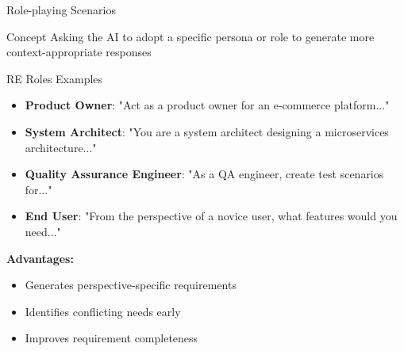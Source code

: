 \documentclass{beamer}
\begin{document}
\begin{frame}[t]{Role-playing Scenarios}
    \begin{block}{Concept}
        Asking the AI to adopt a specific persona or role to generate more context-appropriate responses
    \end{block}
    
    \begin{exampleblock}{RE Roles Examples}
        \begin{itemize}
            \item \textbf{Product Owner}: "Act as a product owner for an e-commerce platform..."
            \item \textbf{System Architect}: "You are a system architect designing a microservices architecture..."
            \item \textbf{Quality Assurance Engineer}: "As a QA engineer, create test scenarios for..."
            \item \textbf{End User}: "From the perspective of a novice user, what features would you need..."
        \end{itemize}
    \end{exampleblock}
    
    \textbf{Advantages:}
    \begin{itemize}
        \item Generates perspective-specific requirements
        \item Identifies conflicting needs early
        \item Improves requirement completeness
    \end{itemize}
\end{frame}
\end{document}
